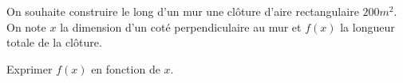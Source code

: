
On souhaite construire le long d'un mur une clôture d'aire rectangulaire $200m^2$. On note $x$ la dimension d'un coté perpendiculaire au mur et $f(x)$ la longueur totale de la clôture.

Exprimer $f(x)$ en fonction de $x$.
